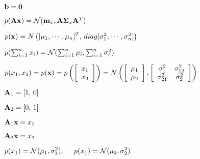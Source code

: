 \documentclass{article}
\def\lthtmlcheckvsize{\ifdim\ht\sizebox<\vsize 
  \ifdim\wd\sizebox<\hsize\expandafter\hfill\fi \expandafter\vfill
  \else\expandafter\vss\fi}%
\begin{document}
{\newpage\clearpage
{}%
$ {\bf b}={\bf0}$%
\lthtmlindisplaymathZ
\lthtmlcheckvsize\clearpage}

{\newpage\clearpage
{}%
$ p({\bf Ax})={\cal N}({\bf m}_x,{\bf A\Sigma}_x{\bf A}^T)$%
\lthtmlindisplaymathZ
\lthtmlcheckvsize\clearpage}

{\newpage\clearpage
{}%
$ p({\bf x})=N\left([\mu_1,\cdots,\mu_n]^T,\,diag[\sigma_1^2,\cdots,\sigma_n^2] \right)$%
\lthtmlindisplaymathZ
\lthtmlcheckvsize\clearpage}

{\newpage\clearpage
{}%
$ p(\sum_{i=1}^nx_i)={\cal N}(\sum_{i=1}^n\mu_i,\sum_{i=1}^n\sigma_i^2)$%
\lthtmlindisplaymathZ
\lthtmlcheckvsize\clearpage}

{\newpage\clearpage
{}%
$\displaystyle p(x_1,x_2)=p({\bf x})=p\left(\left[\begin{array}{c}x_1\\x_2\end{array}\right]\right)
=N\left(\left[\begin{array}{c}\mu_1\\\mu_2\end{array}\right],
\left[\begin{array}{cc}\sigma^2_1&\sigma^2_{12}\\\sigma^2_{21}&\sigma^2_2\end{array}\right]\right)$%
\lthtmlindisplaymathZ
\lthtmlcheckvsize\clearpage}

{\newpage\clearpage
{}%
$ {\bf A}_1=[1,\,0]$%
\lthtmlindisplaymathZ
\lthtmlcheckvsize\clearpage}

{\newpage\clearpage
{}%
$ {\bf A}_2=[0,\,1]$%
\lthtmlindisplaymathZ
\lthtmlcheckvsize\clearpage}

{\newpage\clearpage
{}%
$ {\bf A}_1{\bf x}=x_1$%
\lthtmlindisplaymathZ
\lthtmlcheckvsize\clearpage}

{\newpage\clearpage
{}%
$ {\bf A}_2{\bf x}=x_2$%
\lthtmlindisplaymathZ
\lthtmlcheckvsize\clearpage}

{\newpage\clearpage
{}%
$\displaystyle p(x_1)={\cal N}(\mu_1,\sigma^2_1),\;\;\;\;\;p(x_1)={\cal N}(\mu_2,\sigma^2_2)$%
\lthtmlindisplaymathZ
\lthtmlcheckvsize\clearpage}
\end{document}
